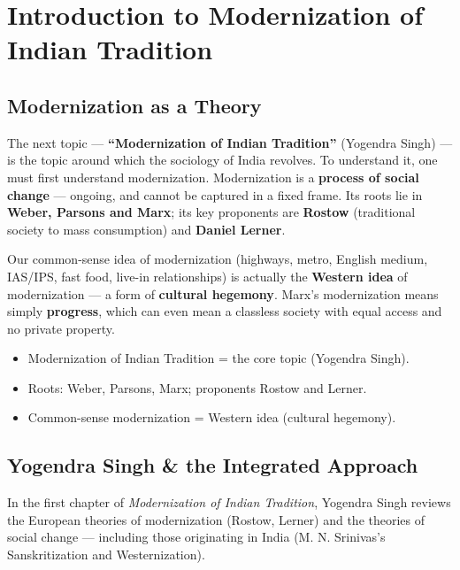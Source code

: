 \chapter{Introduction to Modernization of Indian Tradition}

\section{Modernization as a Theory}

The next topic --- \textbf{``Modernization of Indian Tradition''} (Yogendra Singh) --- is the topic around which the sociology of India revolves. To understand it, one must first understand modernization. Modernization is a \textbf{process of social change} --- ongoing, and cannot be captured in a fixed frame. Its roots lie in \textbf{Weber, Parsons and Marx}; its key proponents are \textbf{Rostow} (traditional society to mass consumption) and \textbf{Daniel Lerner}.

\begin{CriticalPoint}
Our common-sense idea of modernization (highways, metro, English medium, IAS/IPS, fast food, live-in relationships) is actually the \textbf{Western idea} of modernization --- a form of \textbf{cultural hegemony}. Marx's modernization means simply \textbf{progress}, which can even mean a classless society with equal access and no private property.
\end{CriticalPoint}

\begin{QuickRevision}
\begin{itemize}
\item Modernization of Indian Tradition = the core topic (Yogendra Singh).
\item Roots: Weber, Parsons, Marx; proponents Rostow and Lerner.
\item Common-sense modernization = Western idea (cultural hegemony).
\end{itemize}
\end{QuickRevision}

\section{Yogendra Singh \& the Integrated Approach}

In the first chapter of \emph{Modernization of Indian Tradition}, Yogendra Singh reviews the European theories of modernization (Rostow, Lerner) and the theories of social change --- including those originating in India (M. N. Srinivas's Sanskritization and Westernization).

